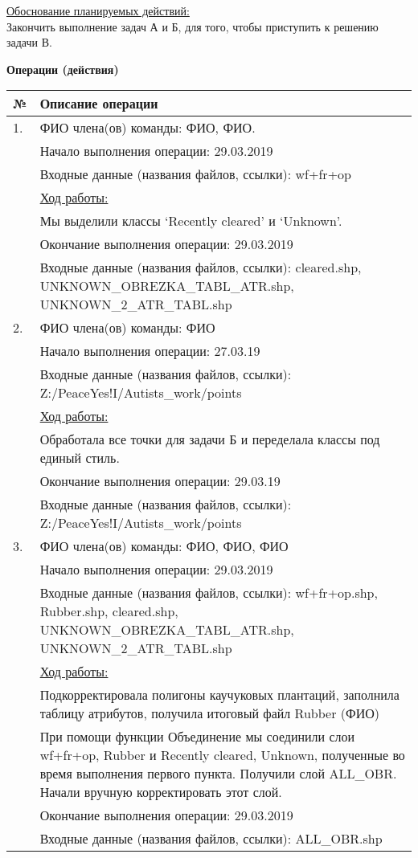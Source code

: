 \noindent\underline{Обоснование планируемых действий:}\\
Закончить выполнение задач А и Б, для того, чтобы приступить к решению задачи В.

\textbf{Операции (действия)}

\begin{center}
    \begin{longtable}{|l|p{14.5cm}|}
        \hline
        № & Описание операции \\
        \hline
        1. & ФИО члена(ов) команды: ФИО, ФИО.\\
           & Начало выполнения операции: 29.03.2019 \\
           & Входные данные (названия файлов, ссылки): wf+fr+op \\
           & \underline{Ход работы:} \\
           & Мы выделили классы ‘Recently cleared’ и ‘Unknown’. \\
           & Окончание выполнения операции: 29.03.2019 \\
           & Входные данные (названия файлов, ссылки): cleared.shp, UNKNOWN\_OBREZKA\_TABL\_ATR.shp, UNKNOWN\_2\_ATR\_TABL.shp \\
         \hline
         2. & ФИО члена(ов) команды: ФИО \\
            & Начало выполнения операции: 27.03.19 \\
            & Входные данные (названия файлов, ссылки): Z:/PeaceYes!I/Autists\_work/points \\
            & \underline{Ход работы:} \\
            & Обработала все точки для задачи Б и переделала классы под единый стиль. \\
            & Окончание выполнения операции: 29.03.19 \\
            & Входные данные (названия файлов, ссылки): Z:/PeaceYes!I/Autists\_work/points \\
         \hline
         3. & ФИО члена(ов) команды: ФИО, ФИО, ФИО \\
            & Начало выполнения операции: 29.03.2019 \\
            & Входные данные (названия файлов, ссылки): wf+fr+op.shp, Rubber.shp, cleared.shp, UNKNOWN\_OBREZKA\_TABL\_ATR.shp, UNKNOWN\_2\_ATR\_TABL.shp \\
            & \underline{Ход работы:} \\
            & Подкорректировала полигоны каучуковых плантаций, заполнила таблицу атрибутов, получила итоговый файл Rubber (ФИО) \\
            & При помощи функции Объединение мы соединили слои  wf+fr+op, Rubber и Recently cleared, Unknown, полученные во время выполнения первого пункта. Получили слой ALL\_OBR. Начали вручную корректировать этот слой. \\
            & Окончание выполнения операции: 29.03.2019 \\
            & Входные данные (названия файлов, ссылки): ALL\_OBR.shp \\
         \hline
   \end{longtable}
\end{center}
